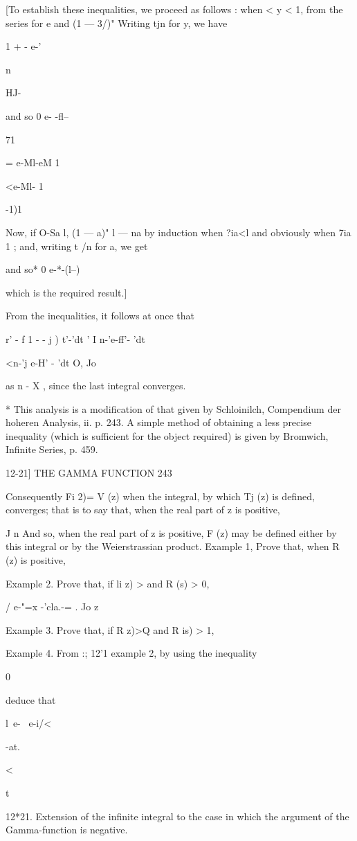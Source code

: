 [To establish these inequalities, we proceed as follows : when < y <
1, from the series for e and (1 — 3/)" Writing tjn for y, we have

1 + - e-'

n

HJ-

and so 0 e- -fl--

71

= e-Ml-eM 1

<e-Ml- 1

-1)1

Now, if O-Sa l, (1 — a)" l — na by induction when ?ia<l and obviously
when 7ia 1 ; and, writing t /n for a, we get

and so* 0 e-*-(l--) %

which is the required result.]

From the inequalities, it follows at once that

r' - f 1 - - j ) t'-'dt ' I n-'e-ff'- 'dt

<n-'j e-H' - 'dt O, Jo

as n - X , since the last integral converges.

* This analysis is a modification of that given by Schloinilch,
Compendium der hoheren Analysis, ii. p. 243. A simple method of
obtaining a less precise inequality (which is sufficient for the
object required) is given by Bromwich, Infinite Series, p. 459.

12-21] THE GAMMA FUNCTION 243

Consequently Fi 2)= V (z) when the integral, by which Tj (z) is
defined, converges; that is to say that, when the real part of z is
positive,

J n And so, when the real part of z is positive, F (z) may be defined
either by this integral or by the Weierstrassian product. Example 1,
Prove that, when R (z) is positive,

Example 2. Prove that, if li z) > and R (s) > 0,

/ e-"=x -'cla.-= . Jo z

Example 3. Prove that, if R z)>Q and R is) > 1,

Example 4. From :; 12'1 example 2, by using the inequality

0%

deduce that

l\ e- \ e-i/<

-at.

<

t

12*21. Extension of the infinite integral to the case in which the
argument of the Gamma-function is negative.

